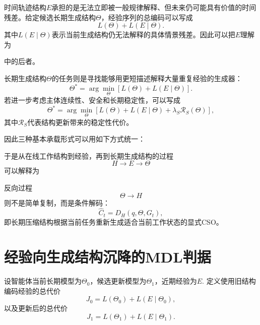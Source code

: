 时间轨迹结构$E$承担的是无法立即被一般规律解释、但未来仍可能具有价值的时间残差。给定候选长期生成结构$\Theta$，经验序列的总编码可以写成
\[
\boxed{
L(\Theta)
+
L(E\mid\Theta).
}
\]
其中$L(E\mid\Theta)$表示当前生成结构仍无法解释的具体情景残差。因此可以把$E$理解为
\begin{statementbox}
\centering
{}
\end{statementbox}
中的后者。

长期生成结构$\Theta$的任务则是寻找能够用更短描述解释大量重复经验的生成器：
\[
\boxed{
\Theta^*
=
\arg\min_{\Theta}
\left[
L(\Theta)
+
L(E\mid\Theta)
\right].
}
\]
若进一步考虑主体连续性、安全和长期稳定性，可以写成
\[
\Theta^*
=
\arg\min_{\Theta}
\left[
L(\Theta)
+
L(E\mid\Theta)
+
\lambda_S\mathcal{R}_{S}(\Theta)
\right],
\]
其中$\mathcal{R}_S$代表结构更新带来的稳定性代价。

因此三种基本承载形式可以用如下方式统一：
\begin{statementbox}
\centering
{}
\end{statementbox}
\begin{statementbox}
\centering
{}
\end{statementbox}
\begin{statementbox}
\centering
{}
\end{statementbox}

于是从在线工作结构到经验，再到长期生成结构的过程
\[
H\rightarrow E\rightarrow\Theta
\]
可以解释为
\begin{statementbox}
\centering
{}
\end{statementbox}

反向过程
\[
\Theta\rightarrow H
\]
则不是简单复制，而是条件解码：
\[
\hat C_t
=
D_H(q,\Theta,G_t),
\]
即长期压缩结构根据当前任务重新生成适合当前工作状态的显式CSO。

\section{经验向生成结构沉降的MDL判据}

设智能体当前长期模型为$\Theta_0$，候选更新模型为$\Theta_1$，近期经验为$E$. 定义使用旧结构编码经验的总代价
\[
J_0
=
L(\Theta_0)
+
L(E\mid\Theta_0),
\]
以及更新后的总代价
\[
J_1
=
L(\Theta_1)
+
L(E\mid\Theta_1).
\]

